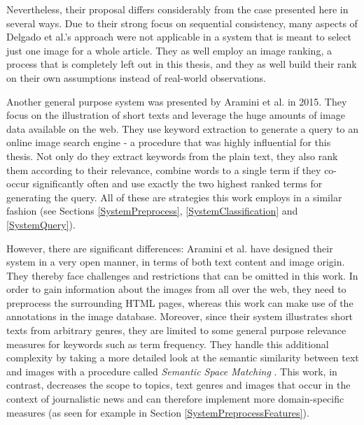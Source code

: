 \documentclass[11pt,a4paper,twoside]{article}
\begin{document}
Nevertheless, their proposal differs considerably from the case presented here in several ways. Due to their strong focus on sequential consistency, many aspects of Delgado et al.'s approach were not applicable in a system that is meant to select just one image for a whole article. They as well employ an image ranking, a process that is completely left out in this thesis, and they as well build their rank on their own assumptions instead of real-world observations.

\bigskip

Another general purpose system was presented by Aramini et al. in 2015. \cite{Aramini2015AutomaticImages} They focus on the illustration of short texts and leverage the huge amounts of image data available on the web. They use keyword extraction to generate a query to an online image search engine - a procedure that was highly influential for this thesis. Not only do they extract keywords from the plain text, they also rank them according to their relevance, combine words to a single term if they co-occur significantly often and use exactly the two highest ranked terms for generating the query. All of these are strategies this work employs in a similar fashion (see Sections \ref{SystemPreprocess}, \ref{SystemClassification} and \ref{SystemQuery}).

However, there are significant differences: Aramini et al. have designed their system in a very open manner, in terms of both text content and image origin. They thereby face challenges and restrictions that can be omitted in this work. In order to gain information about the images from all over the web, they need to preprocess the surrounding HTML pages, whereas this work can make use of the annotations in the image database. Moreover, since their system illustrates short texts from arbitrary genres, they are limited to some general purpose relevance measures for keywords such as term frequency. They handle this additional complexity by taking a more detailed look at the semantic similarity between text and images with a procedure called \emph{Semantic Space Matching} \cite[pp. 140-144]{Aramini2015AutomaticImages}. This work, in contrast, decreases the scope to topics, text genres and images that occur in the context of journalistic news and can therefore implement more domain-specific measures (as seen for example in Section \ref{SystemPreprocessFeatures}).

\bigskip
\end{document}
